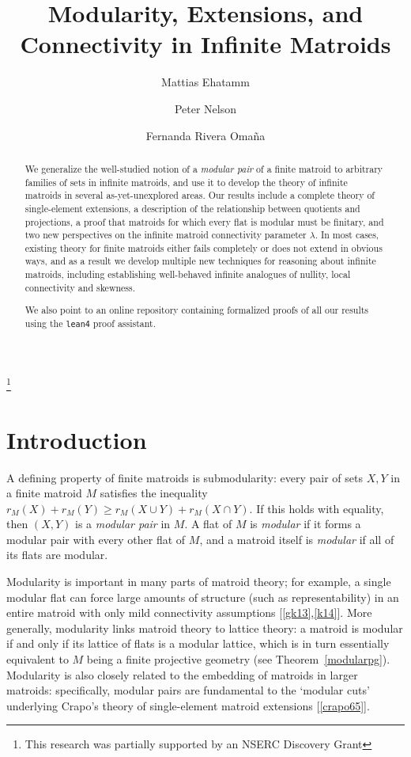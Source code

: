\documentclass{amsart}
\title{Modularity, Extensions, and Connectivity in Infinite Matroids}
\author[Ehatamm]{Mattias Ehatamm}
\author[Nelson]{Peter Nelson}
\author[Rivera Oma\~na]{Fernanda Rivera Oma\~na}
\theoremstyle{plain}
\theoremstyle{definition}
\renewcommand{\ge}{\geqslant}
\begin{document}
\thanks{This research was partially supported by an NSERC Discovery Grant}
\sloppy
\begin{abstract}
We generalize the well-studied notion of a \emph{modular pair} of a finite matroid to arbitrary families of sets in 
infinite matroids, and use it to develop the theory of infinite matroids in several 
as-yet-unexplored areas. Our results include a complete theory of single-element extensions, 
a description of the relationship between quotients and projections, 
a proof that matroids for which every flat is modular must be finitary, 
and two new perspectives on the infinite matroid connectivity parameter $\lambda$. 
In most cases, existing theory for finite matroids either fails completely
or does not extend in obvious ways, and as a result we develop multiple new techniques for 
reasoning about infinite matroids, including establishing well-behaved
infinite analogues of nullity, local connectivity and skewness. 

We also point to an online repository containing formalized proofs of 
all our results using the \texttt{lean4} proof assistant. 
\end{abstract}
\maketitle


\section{Introduction}

A defining property of finite matroids is submodularity: every pair of sets $X, Y$ in a finite matroid $M$
satisfies the inequality $r_M(X) + r_M(Y) \ge r_M(X \cup Y) + r_M(X \cap Y)$. 
If this holds with equality, then $(X,Y)$ is a \emph{modular pair} in $M$. 
A flat of $M$ is \emph{modular} if it forms a modular pair with every other flat of $M$, 
and a matroid itself is \emph{modular} if all of its flats are modular. 

Modularity is important in many parts of matroid theory; 
for example, a single modular flat can force large amounts of structure (such as representability)
in an entire matroid with only mild connectivity assumptions [\ref{gk13},\ref{k14}]. 
More generally, modularity links matroid theory to lattice theory: 
a matroid is modular if and only if its lattice of flats is a modular lattice, 
which is in turn essentially equivalent to $M$ being a finite projective geometry 
(see Theorem~\ref{modularpg}). 
Modularity is also closely related to the embedding of matroids in larger matroids:
specifically, modular pairs are fundamental to the `modular cuts' underlying 
Crapo's theory of single-element matroid extensions [\ref{crapo65}].
\end{document}
